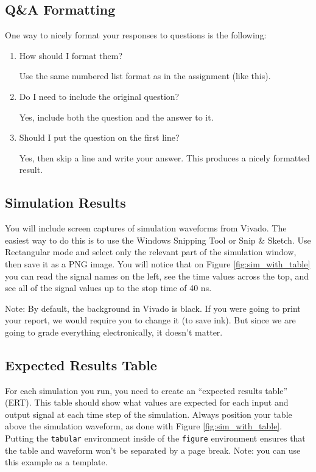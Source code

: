 \documentclass[11pt]{article}
\begin{document}
\subsection*{Q\&A Formatting}
One way to nicely format your responses to questions is the following:

\begin{enumerate}
	\item How should I format them?
	
	Use the same numbered list format as in the assignment (like this).
	
	\item Do I need to include the original question?
	
	Yes, include both the question and the answer to it.
	
	\item Should I put the question on the first line?
	
	Yes, then skip a line and write your answer.  This produces a nicely formatted result.
\end{enumerate}


\subsection*{Simulation Results}
You will include screen captures of simulation waveforms from Vivado.  The easiest way to do this is to use the Windows Snipping Tool or Snip \& Sketch.  Use Rectangular mode and select only the relevant part of the simulation window, then save it as a PNG image.  You will notice that on Figure \ref{fig:sim_with_table} you can read the signal names on the left, see the time values across the top, and see all of the signal values up to the stop time of 40 ns. 

Note: By default, the background in Vivado is black. If you were going to print your report, we would require you to change it (to save ink).  But since we are going to grade everything electronically, it doesn't matter.


\subsection*{Expected Results Table}
For each simulation you run, you need to create an ``expected results table'' (ERT).  This table should show what values are expected for each input and output signal at each time step of the simulation.  Always position your table above the simulation waveform, as done with Figure \ref{fig:sim_with_table}.  Putting the \texttt{tabular} environment inside of the \texttt{figure} environment ensures that the table and waveform won't be separated by a page break.  Note: you can use this example as a template.
\end{document}
